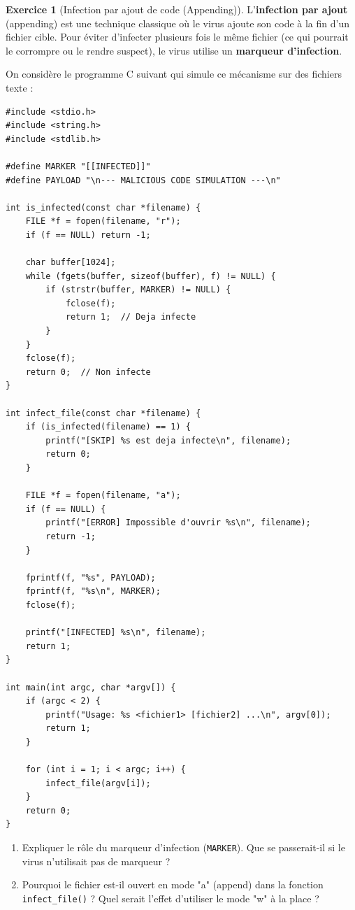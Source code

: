 \documentclass[a4paper,11pt]{article}
\theoremstyle{plain}
\theoremstyle{definition}
\newtheorem{exercice}{Exercice}
\begin{document}
\begin{exercice}[Infection par ajout de code (Appending)]

L'\textbf{infection par ajout} (appending) est une technique classique où le virus ajoute son code à la fin d'un fichier cible. Pour éviter d'infecter plusieurs fois le même fichier (ce qui pourrait le corrompre ou le rendre suspect), le virus utilise un \textbf{marqueur d'infection}.

On considère le programme C suivant qui simule ce mécanisme sur des fichiers texte :

\begin{verbatim}
#include <stdio.h>
#include <string.h>
#include <stdlib.h>

#define MARKER "[[INFECTED]]"
#define PAYLOAD "\n--- MALICIOUS CODE SIMULATION ---\n"

int is_infected(const char *filename) {
    FILE *f = fopen(filename, "r");
    if (f == NULL) return -1;

    char buffer[1024];
    while (fgets(buffer, sizeof(buffer), f) != NULL) {
        if (strstr(buffer, MARKER) != NULL) {
            fclose(f);
            return 1;  // Deja infecte
        }
    }
    fclose(f);
    return 0;  // Non infecte
}

int infect_file(const char *filename) {
    if (is_infected(filename) == 1) {
        printf("[SKIP] %s est deja infecte\n", filename);
        return 0;
    }

    FILE *f = fopen(filename, "a");
    if (f == NULL) {
        printf("[ERROR] Impossible d'ouvrir %s\n", filename);
        return -1;
    }

    fprintf(f, "%s", PAYLOAD);
    fprintf(f, "%s\n", MARKER);
    fclose(f);

    printf("[INFECTED] %s\n", filename);
    return 1;
}

int main(int argc, char *argv[]) {
    if (argc < 2) {
        printf("Usage: %s <fichier1> [fichier2] ...\n", argv[0]);
        return 1;
    }

    for (int i = 1; i < argc; i++) {
        infect_file(argv[i]);
    }
    return 0;
}
\end{verbatim}

\begin{enumerate}
\item Expliquer le rôle du marqueur d'infection (\texttt{MARKER}). Que se passerait-il si le virus n'utilisait pas de marqueur ?

\item Pourquoi le fichier est-il ouvert en mode "a" (append) dans la fonction \texttt{infect\_file()} ? Quel serait l'effet d'utiliser le mode "w" à la place ?


\end{enumerate}
\end{exercice}
\end{document}
